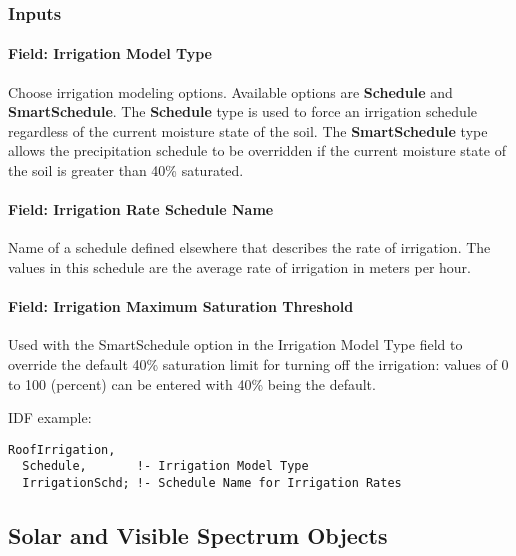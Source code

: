 \subsubsection{Inputs}\label{inputs-23-002}

\paragraph{Field: Irrigation Model Type}\label{field-irrigation-model-type}

Choose irrigation modeling options. Available options are \textbf{Schedule} and \textbf{SmartSchedule}. The \textbf{Schedule} type is used to force an irrigation schedule regardless of the current moisture state of the soil. The \textbf{SmartSchedule} type allows the precipitation schedule to be overridden if the current moisture state of the soil is greater than 40\% saturated.

\paragraph{Field: Irrigation Rate Schedule Name}\label{field-irrigation-rate-schedule-name}

Name of a schedule defined elsewhere that describes the rate of irrigation. The values in this schedule are the average rate of irrigation in meters per hour.

\paragraph{Field: Irrigation Maximum Saturation Threshold}\label{field-irrigation-maximum-saturation-threshold}

Used with the SmartSchedule option in the Irrigation Model Type field to override the default 40\% saturation limit for turning off the irrigation: values of 0 to 100 (percent) can be entered with 40\% being the default.

IDF example:

\begin{lstlisting}
RoofIrrigation,
  Schedule,       !- Irrigation Model Type
  IrrigationSchd; !- Schedule Name for Irrigation Rates
\end{lstlisting}

\subsection{Solar and Visible Spectrum Objects}\label{solar-and-visible-spectrum-objects}


